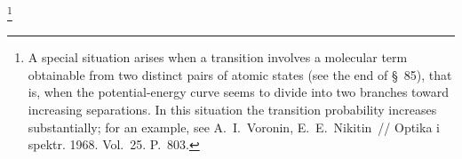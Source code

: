 \footnote{A special situation arises when a transition involves a molecular term obtainable from two distinct pairs of atomic states (see the end of \S~85), that is, when the potential-energy curve seems to divide into two branches toward increasing separations.  In this situation the transition probability increases substantially; for an example, see A.~I.~Voronin, E.~E.~Nikitin~// Optika i spektr. 1968. Vol.~25. P.~803.}

